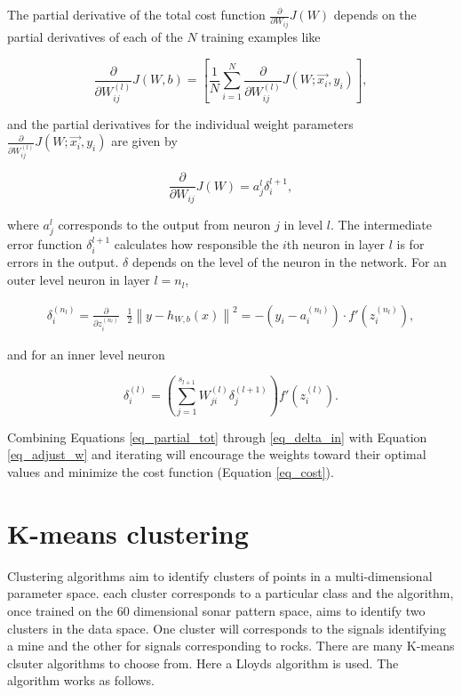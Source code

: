 \documentclass[10pt]{article}
\begin{document}
The partial derivative of the total cost function $\frac{\partial}{\partial W_{ij}} J\left( W \right)$ depends on the partial derivatives of each of the $N$ training examples like 

\begin{equation}
\frac{\partial}{\partial W_{ij}^{(l)}} J(W,b) = \left[ \frac{1}{N} \sum_{i=1}^N \frac{\partial}{\partial W_{ij}^{(l)}} J(W; \vec{x_i}, y_i) \right], 
\label{eq_partial_tot}
\end{equation}


\noindent and the partial derivatives for the individual weight parameters $\frac{\partial}{\partial W_{ij}^{(l)}} J(W; \vec{x_i}, y_i)$ are given by 



\begin{equation}
\frac{\partial}{\partial W_{ij}} J\left( W \right) = a_j^l \delta_i^{l+1},
\label{eq_partdiv}
\end{equation}

\noindent where $a_j^l$ corresponds to the output from neuron $j$ in level $l$. The intermediate error function $\delta_i^{l+1}$ calculates how responsible the $i$th neuron in layer $l$ is for errors in the output. $\delta$ depends on the level of the neuron in the network. For an outer level neuron in layer $l=n_l$,

\begin{align}
\delta^{(n_l)}_i
= \frac{\partial}{\partial z^{(n_l)}_i} \;\;
\frac{1}{2} \left\|y - h_{W,b}(x)\right\|^2 = - (y_i - a^{(n_l)}_i) \cdot f'(z^{(n_l)}_i),
\label{eq_delta}
\end{align}


\noindent and for an inner level neuron

\begin{equation}
\delta^{(l)}_i = \left( \sum_{j=1}^{s_{l+1}} W^{(l)}_{ji} \delta^{(l+1)}_j \right) f'(z^{(l)}_i).
\label{eq_delta_in}
\end{equation}


Combining Equations \ref{eq_partial_tot} through \ref{eq_delta_in} with Equation \ref{eq_adjust_w} and iterating will encourage the weights toward their optimal values and minimize the cost function (Equation \ref{eq_cost}).



\section{K-means clustering}
Clustering algorithms aim to identify clusters of points in a multi-dimensional parameter space. each cluster corresponds to a particular class and the algorithm, once trained on the 60 dimensional sonar pattern space, aims to identify two clusters in the data space. One cluster will corresponds to the signals identifying a mine and the other for signals corresponding to rocks. There are many K-means clsuter algorithms to choose from. Here a Lloyds algorithm is used. The algorithm works as follows.
\end{document}
